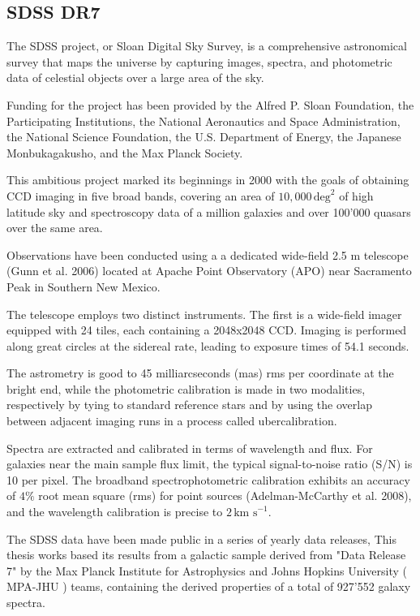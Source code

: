 \subsection{SDSS DR7}
The SDSS project, or Sloan Digital Sky Survey, is a comprehensive astronomical survey that maps the universe by capturing images, spectra, and photometric data of celestial objects over a large area of the sky. \cite{2009ApJS..182..543A}

Funding for the project has been provided by the Alfred P. Sloan Foundation, the Participating Institutions, the National Aeronautics and Space Administration, the National Science Foundation, the U.S. Department of Energy, the Japanese Monbukagakusho, and the Max Planck Society.

This ambitious project marked its beginnings in 2000 with the goals of obtaining CCD imaging in five broad bands, covering an area of $10,000 \, \text{deg}^2$ of high latitude sky and spectroscopy data of a million galaxies and over 100'000 quasars over the same area.

Observations have been conducted using a a dedicated wide-field 2.5 m telescope (Gunn
et al. 2006) located at Apache Point Observatory (APO) near Sacramento Peak in Southern New Mexico.

The telescope employs two distinct instruments. The first is a wide-field imager equipped with 24 tiles, each containing a 2048x2048 CCD. Imaging is performed along great circles at the sidereal rate, leading to exposure times of 54.1 seconds.

The astrometry is good to 45 milliarcseconds (mas) rms per coordinate at the bright end, while the photometric calibration is made in two modalities, respectively by tying to standard reference stars and by using the overlap between adjacent imaging runs in a process called ubercalibration.

Spectra are extracted and calibrated in terms of wavelength and flux. For galaxies near the main sample flux limit, the typical signal-to-noise ratio (S/N) is 10 per pixel. The broadband spectrophotometric calibration exhibits an accuracy of $4\%$ root mean square (rms) for point sources (Adelman-McCarthy et al. 2008), and the wavelength calibration is precise to $2 \, \text{km s}^{-1}$.

The SDSS data have been made public in a series of yearly data releases, This thesis works based its results from a galactic sample derived from "Data Release 7" by the Max Planck Institute for Astrophysics and Johns Hopkins University ( MPA-JHU )  teams, containing the derived properties of a total of 927'552 galaxy spectra.

